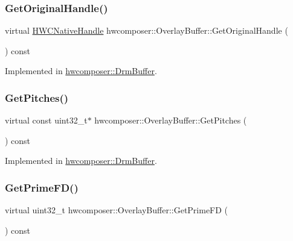 \subsubsection{\texorpdfstring{Get\+Original\+Handle()}{GetOriginalHandle()}}
{\footnotesize\ttfamily virtual \mbox{\hyperlink{alios_2platformdefines_8h_ac0a2eaf260f556d17fe489911f017bdf}{H\+W\+C\+Native\+Handle}} hwcomposer\+::\+Overlay\+Buffer\+::\+Get\+Original\+Handle (\begin{DoxyParamCaption}{ }\end{DoxyParamCaption}) const\hspace{0.3cm}{\ttfamily [pure virtual]}}



Implemented in \mbox{\hyperlink{classhwcomposer_1_1DrmBuffer_a66a876cebee293bc84bf0dc6edd35f0c}{hwcomposer\+::\+Drm\+Buffer}}.

\mbox{\label{classhwcomposer_1_1OverlayBuffer_aa359c9f8d8c6fbcaf4ee2268e4d377f6}} 
\subsubsection{\texorpdfstring{Get\+Pitches()}{GetPitches()}}
{\footnotesize\ttfamily virtual const uint32\+\_\+t$\ast$ hwcomposer\+::\+Overlay\+Buffer\+::\+Get\+Pitches (\begin{DoxyParamCaption}{ }\end{DoxyParamCaption}) const\hspace{0.3cm}{\ttfamily [pure virtual]}}



Implemented in \mbox{\hyperlink{classhwcomposer_1_1DrmBuffer_a6241968d9bcfff9e6e746feb75422f17}{hwcomposer\+::\+Drm\+Buffer}}.

\mbox{\label{classhwcomposer_1_1OverlayBuffer_a32b5e1284161f9c129ad79ac11da760e}} 
\subsubsection{\texorpdfstring{Get\+Prime\+F\+D()}{GetPrimeFD()}}
{\footnotesize\ttfamily virtual uint32\+\_\+t hwcomposer\+::\+Overlay\+Buffer\+::\+Get\+Prime\+FD (\begin{DoxyParamCaption}{ }\end{DoxyParamCaption}) const\hspace{0.3cm}{\ttfamily [pure virtual]}}



